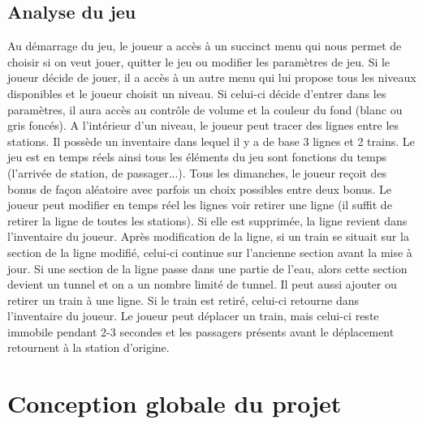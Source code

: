 \documentclass[report, backcover, french, nodocumentinfo]{upmethodology-document}
\begin{document}
		\section{Analyse du jeu}
			\p{}
				Au démarrage du jeu, le joueur a accès à un succinct menu qui nous permet de choisir si on veut jouer, quitter le jeu ou modifier les paramètres de jeu. Si le joueur décide de jouer, il a accès à un autre menu qui lui propose tous les niveaux disponibles et le joueur choisit un niveau. Si celui-ci décide d'entrer dans les paramètres, il aura accès au contrôle de volume et la couleur du fond (blanc ou gris foncés).
			\p{}
				A l'intérieur d'un niveau, le joueur peut tracer des lignes entre les stations. Il possède un inventaire dans lequel il y a de base 3 lignes et 2 trains. Le jeu est en temps réels ainsi tous les éléments du jeu sont fonctions du temps (l'arrivée de station, de passager...). Tous les dimanches, le joueur reçoit des bonus de façon aléatoire avec parfois un choix possibles entre deux bonus.
			\p{}
				Le joueur peut modifier en temps réel les lignes voir retirer une ligne (il suffit de retirer la ligne de toutes les stations). Si elle est supprimée, la ligne revient dans l'inventaire du joueur. Après modification de la ligne, si un train se situait sur la section de la ligne modifié, celui-ci continue sur l'ancienne section avant la mise à jour. Si une section de la ligne passe dans une partie de l'eau, alors cette section devient un tunnel et on a un nombre limité de tunnel.
			\p{}
				Il peut aussi ajouter ou retirer un train à une ligne. Si le train est retiré, celui-ci retourne dans l'inventaire du joueur. Le joueur peut déplacer un train, mais celui-ci reste immobile pendant 2-3 secondes et les passagers présents avant le déplacement retournent à la station d'origine.

	\chapter{Conception globale du projet}
\end{document}
